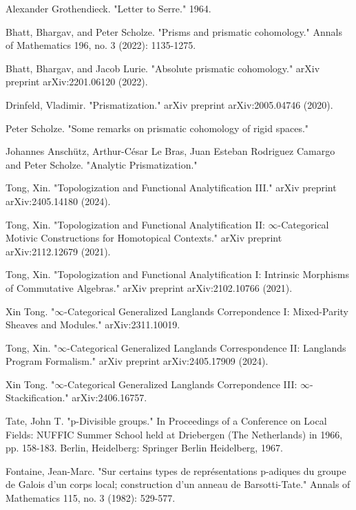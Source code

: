 \documentclass[12pt]{article}
\theoremstyle{definition}
\begin{document}
\newpage
\begin{thebibliography}{}
 Alexander Grothendieck. "Letter to Serre." 1964.


 Bhatt, Bhargav, and Peter Scholze. "Prisms and prismatic cohomology." Annals of Mathematics 196, no. 3 (2022): 1135-1275.

 Bhatt, Bhargav, and Jacob Lurie. "Absolute prismatic cohomology." arXiv preprint arXiv:2201.06120 (2022).

 Drinfeld, Vladimir. "Prismatization." arXiv preprint arXiv:2005.04746 (2020).

 Peter Scholze. "Some remarks on prismatic cohomology of rigid spaces."

 Johannes Ansch\"utz, Arthur-C\'esar Le Bras, Juan Esteban Rodriguez Camargo and Peter Scholze. "Analytic Prismatization."

 Tong, Xin. "Topologization and Functional Analytification III." arXiv preprint arXiv:2405.14180 (2024).

 Tong, Xin. "Topologization and Functional Analytification II: $\infty $-Categorical Motivic Constructions for Homotopical Contexts." arXiv preprint arXiv:2112.12679 (2021).

 Tong, Xin. "Topologization and Functional Analytification I: Intrinsic Morphisms of Commutative Algebras." arXiv preprint arXiv:2102.10766 (2021).

 Xin Tong. "$\infty$-Categorical Generalized Langlands Correpondence I: Mixed-Parity Sheaves and Modules." arXiv:2311.10019.

  Tong, Xin. "$\infty $-Categorical Generalized Langlands Correspondence II: Langlands Program Formalism." arXiv preprint arXiv:2405.17909 (2024). 

 Xin Tong. "$\infty$-Categorical Generalized Langlands Correpondence III: $\infty$-Stackification." arXiv:2406.16757. 


 Tate, John T. "p-Divisible groups." In Proceedings of a Conference on Local Fields: NUFFIC Summer School held at Driebergen (The Netherlands) in 1966, pp. 158-183. Berlin, Heidelberg: Springer Berlin Heidelberg, 1967.

 Fontaine, Jean-Marc. "Sur certains types de repr\'esentations p-adiques du groupe de Galois d'un corps local; construction d'un anneau de Barsotti-Tate." Annals of Mathematics 115, no. 3 (1982): 529-577.


\end{thebibliography}
\end{document}
